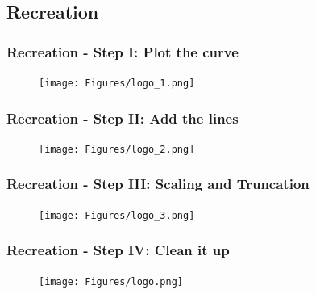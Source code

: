 \documentclass{beamer}
\theoremstyle{remark}
\numberwithin{equation}{section}
\begin{document}
\subsection{Recreation}
\begin{frame}[fragile]
    \frametitle{Recreation - Step I: Plot the curve}

    \begin{figure}[H]
		\centering
		\texttt{[image: Figures/logo\_1.png]}
	\end{figure}

\end{frame}

\begin{frame}[fragile]
    \frametitle{Recreation - Step II: Add the lines}

    \begin{figure}[H]
		\centering
		\texttt{[image: Figures/logo\_2.png]}
	\end{figure}

\end{frame}

\begin{frame}[fragile]
    \frametitle{Recreation - Step III: Scaling and Truncation}

    \begin{figure}[H]
		\centering
		\texttt{[image: Figures/logo\_3.png]}
	\end{figure}

\end{frame}

\begin{frame}[fragile]
    \frametitle{Recreation - Step IV: Clean it up}

    \begin{figure}[H]
		\centering
		\texttt{[image: Figures/logo.png]}
	\end{figure}

\end{frame}
\end{document}
